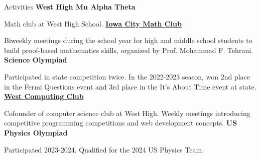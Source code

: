 \begin{rubric}{Activities}
\entry*[2019-present] \textbf{West High Mu Alpha Theta}
    \par Math club at West High School.
\entry*[2021-present] \textbf{\href{https://homepage.divms.uiowa.edu/~mftehrani/MathClub.html}{Iowa City Math Club}}
    \par Biweekly meetings during the school year for high and middle school students to build proof-based mathematics skills, organized by Prof. Mohammad F. Tehrani.
\entry*[2021-present] \textbf{Science Olympiad}
    \par Participated in state competition twice. In the 2022-2023 season, won 2nd place in the Fermi Questions event and 3rd place in the It's About Time event at state.
\entry*[2023] \textbf{\href{https://west-computing-club.github.io}{West Computing Club}}
    \par Cofounder of computer science club at West High. Weekly meetings introducing competitive programming competitions and web development concepts.
\entry*[2024] \textbf{US Physics Olympiad}
    \par Participated 2023-2024. Qualified for the 2024 US Physics Team.
\end{rubric}